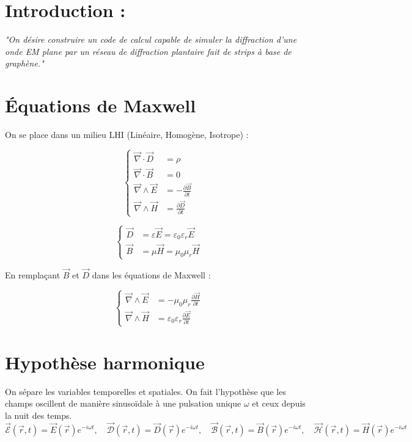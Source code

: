 \documentclass{article}
\begin{document}
\section*{Introduction :}
\bigskip
\textit{"On désire construire un code de calcul capable de simuler la diffraction d’une onde EM plane
par un réseau de diffraction plantaire fait de strips à base de graphène."
}
\section*{Équations de Maxwell}

On se place dans un milieu LHI (Linéaire, Homogène, Isotrope) :

\[
\left\{
\begin{aligned}
\vec{\nabla} \cdot \vec{D} &= \rho \\
\vec{\nabla} \cdot \vec{B} &= 0 \\
\vec{\nabla} \wedge \vec{E} &= -\frac{\partial \vec{B}}{\partial t} \\
\vec{\nabla} \wedge \vec{H} &= \frac{\partial \vec{D}}{\partial t}
\end{aligned}
\right.
\]


\[
\left\{
\begin{aligned}
\vec{D} &= \varepsilon \vec{E} = \varepsilon_0 \varepsilon_r \vec{E} \\
\vec{B} &= \mu \vec{H} = \mu_0 \mu_r \vec{H}
\end{aligned}
\right.
\]

En remplaçant \(\vec{B}\) et \(\vec{D}\) dans les équations de Maxwell :

\[
\left\{
\begin{aligned}
\vec{\nabla} \wedge \vec{E} &= - \mu_0 \mu_r \frac{\partial \vec{H}}{\partial t} \\
\vec{\nabla} \wedge \vec{H} &= \varepsilon_0 \varepsilon_r \frac{\partial \vec{E}}{\partial t}
\end{aligned}
\right.
\]

\section*{Hypothèse harmonique}

On sépare les variables temporelles et spatiales. On fait l’hypothèse que les champs oscillent de manière sinusoïdale à une pulsation unique \(\omega\) et ceux depuis la nuit des temps.
\[
\vec{\mathcal{E}}(\vec{r}, t) = \vec{E}(\vec{r}) e^{-i \omega t}, \quad
\vec{\mathcal{D}}(\vec{r}, t) = \vec{D}(\vec{r}) e^{-i \omega t}, \quad
\vec{\mathcal{B}}(\vec{r}, t) = \vec{B}(\vec{r}) e^{-i \omega t}, \quad
\vec{\mathcal{H}}(\vec{r}, t) = \vec{H}(\vec{r}) e^{-i \omega t}
\]
\end{document}
